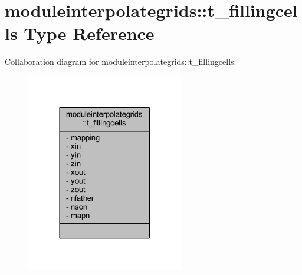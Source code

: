 \hypertarget{structmoduleinterpolategrids_1_1t__fillingcells}{}\section{moduleinterpolategrids\+:\+:t\+\_\+fillingcells Type Reference}
\label{structmoduleinterpolategrids_1_1t__fillingcells}


Collaboration diagram for moduleinterpolategrids\+:\+:t\+\_\+fillingcells\+:\nopagebreak
\begin{figure}[H]
\begin{center}
\leavevmode
\includegraphics[width=194pt]{structmoduleinterpolategrids_1_1t__fillingcells__coll__graph}
\end{center}
\end{figure}
